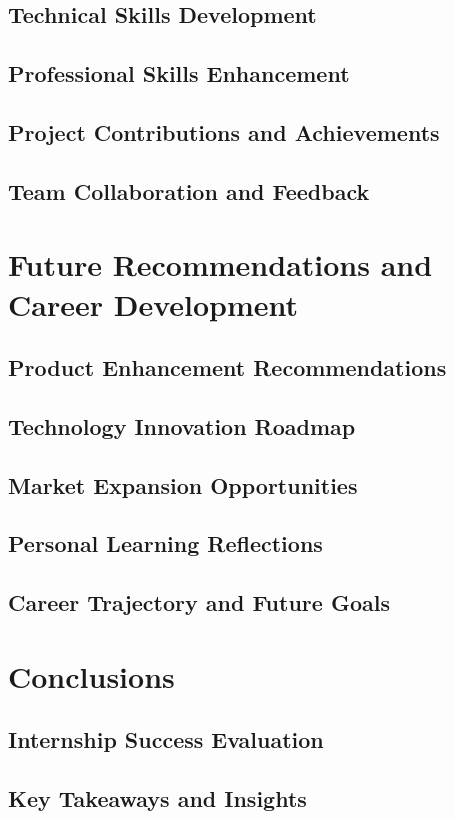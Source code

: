 \documentclass[a4paper, 11pt, oneside]{report}
\begin{document}
\section{Technical Skills Development}
\section{Professional Skills Enhancement}
\section{Project Contributions and Achievements}
\section{Team Collaboration and Feedback}


\chapter{Future Recommendations and Career Development}
\section{Product Enhancement Recommendations}
\section{Technology Innovation Roadmap}
\section{Market Expansion Opportunities}
\section{Personal Learning Reflections}
\section{Career Trajectory and Future Goals}


\chapter{Conclusions}
\section{Internship Success Evaluation}
\section{Key Takeaways and Insights}
\end{document}
